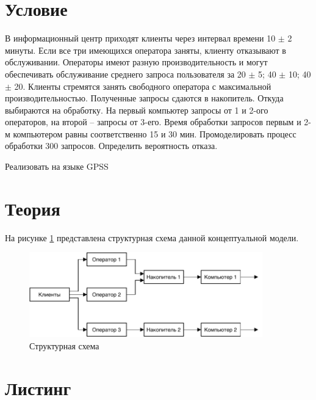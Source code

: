\section{Условие}

В информационный центр приходят клиенты через интервал времени 10 $\pm$ 2 минуты. Если все три имеющихся оператора заняты, клиенту отказывают в обслуживании. Операторы имеют разную производительность и могут обеспечивать обслуживание среднего запроса пользователя за 20 $\pm$ 5; 40 $\pm$ 10; 40 $\pm$ 20. Клиенты стремятся занять свободного оператора с максимальной производительностью. Полученные запросы сдаются в накопитель. Откуда выбираются на обработку. На первый компьютер запросы от 1 и 2-ого операторов, на второй -- запросы от 3-его. Время обработки запросов первым и 2-м компьютером равны соответственно 15 и 30 мин. Промоделировать процесс обработки 300 запросов. Определить вероятность отказа.

Реализовать на языке GPSS

\section{Теория}

На рисунке \ref{fig:model} представлена структурная схема  данной концептуальной модели.

\begin{figure}[H]
    \centering
    \includegraphics[width=0.9\textwidth]{img/content/model.pdf}
    \caption{Структурная схема}
    \label{fig:model}
\end{figure}

\section{Листинг}

